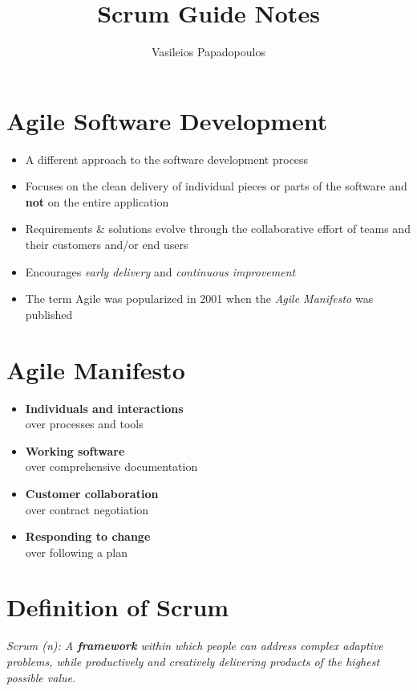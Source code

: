 \documentclass[a4paper,11pt,twocolumn]{article}
\title{\textbf{Scrum Guide Notes} \vspace{-2ex}}
\author{Vasileios Papadopoulos}
\date{}
\begin{document}
\maketitle

\thispagestyle{fancy}

\section*{Agile Software Development}
\begin{itemize}
	\item A different approach to the software development process
	\item Focuses on the clean delivery of individual pieces or parts of the software and \textbf{not} on the entire application
	\item Requirements \& solutions evolve through the collaborative effort of teams and their customers and/or end users
	\item Encourages \textit{early delivery} and \textit{continuous improvement}
	\item The term Agile was popularized in 2001 when the \textit{Agile Manifesto} was published
\end{itemize}

\section*{Agile Manifesto}
\begin{itemize}
	\item \textbf{Individuals and interactions}\\
	over processes and tools
	\item \textbf{Working software}\\
	over comprehensive documentation
	\item \textbf{Customer collaboration}\\
	over contract negotiation
	\item \textbf{Responding to change}\\
	over following a plan
\end{itemize}

\section*{Definition of Scrum}
\textit{Scrum (n): A \textbf{framework} within which people can address complex adaptive problems, while productively and creatively delivering products of the highest possible value.}
\end{document}
